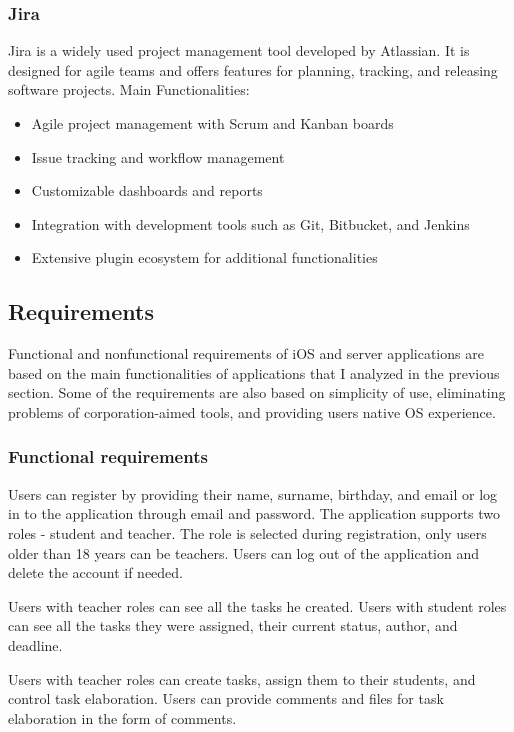 \documentclass[
  biblatex,
  language=english,
  figures=false,
  sourcecodes,
  glossaries,
  index
]{kidiplom}
\begin{document}
\subsubsection{Jira}
Jira is a widely used project management tool developed by Atlassian. It is designed for agile teams and offers features for planning, tracking, and releasing software projects. Main Functionalities:
\begin{itemize}
	\item Agile project management with Scrum and Kanban boards
	\item Issue tracking and workflow management
         \item Customizable dashboards and reports
	\item Integration with development tools such as Git, Bitbucket, and Jenkins
	\item Extensive plugin ecosystem for additional functionalities
\end{itemize}

\subsection{Requirements}
Functional and nonfunctional requirements of iOS and server applications are based on the main functionalities of applications that I analyzed in the previous section. Some of the requirements are also based on simplicity of use, eliminating problems of corporation-aimed tools, and providing users native OS experience.

\subsubsection{Functional requirements}

Users can register by providing their name, surname, birthday, and email or log in to the application through email and password. The application supports two roles - student and teacher. The role is selected during registration, only users older than 18 years can be teachers. Users can log out of the application and delete the account if needed.

Users with teacher roles can see all the tasks he created. Users with student roles can see all the tasks they were assigned, their current status, author, and deadline. 

Users with teacher roles can create tasks, assign them to their students, and control task elaboration. Users can provide comments and files for task elaboration in the form of comments.
\end{document}
